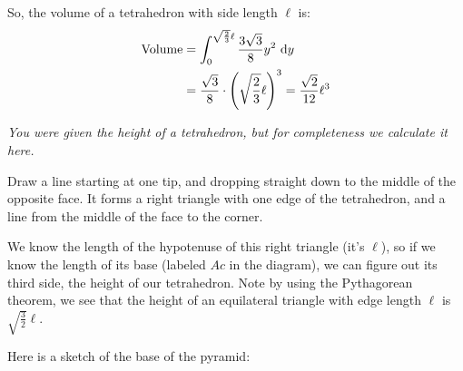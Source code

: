 \begin{solution}
So, the volume of a tetrahedron with side length $\ell$ is:
\begin{align*}
\mbox{Volume}&=\int_0^{\sqrt{\frac{2}{3}}\ell}\frac{3\sqrt{3}}{8}y^2\ \dee{y}\\
&=\frac{\sqrt{3}}{8}\cdot \left(\sqrt{\frac{2}{3}}\ell\right)^3=\frac{\sqrt{2}}{12}\ell^3
\end{align*}



\emph{You were given the height of a tetrahedron, but for completeness we calculate it here.}


Draw a line starting at one tip, and dropping straight down to the middle of the opposite face. It forms a right triangle with one edge of the tetrahedron, and a line from the middle of the face to the corner.


\begin{center}
\end{center}

We know the length of the hypotenuse of this right triangle (it's $\ell$), so if we know the length of its base (labeled $Ac$ in the diagram), we can figure out its third side, the height of our tetrahedron. Note by using the Pythagorean theorem, we see that the height of an equilateral triangle with edge length $\ell$ is $\sqrt{\frac{3}{2}}\ell$.

Here is a sketch of the base of the pyramid:

\begin{center}
\end{center}


\end{solution}
